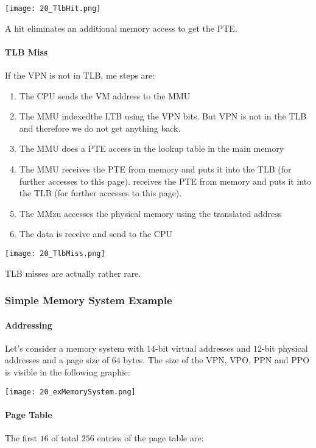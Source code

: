 \texttt{[image: 20\_TlbHit.png]}

A hit eliminates an additional memory access to get the PTE.

\paragraph{TLB Miss}
If the VPN is not in TLB, me steps are:

\begin{enumerate}
    \item The CPU sends the VM address to the MMU
    \item The MMU indexedthe LTB using the VPN bits. But VPN is not in the TLB and therefore we do not get anything back.
    \item The MMU does a PTE access in the lookup table in the main memory
    \item The MMU receives the PTE from memory and puts it into the TLB (for further accesses to this page). receives the PTE from memory and puts it into the TLB (for further accesses to this page).
    \item The MMzu accesses the physical memory using the translated address
    \item The data is receive and send to the CPU
\end{enumerate}

\texttt{[image: 20\_TlbMiss.png]}

TLB misses are actually rather rare.

\subsubsection{Simple Memory System Example}

\paragraph{Addressing}
Let's consider a memory system with $14$-bit virtual addresses and $12$-bit physical addresses and a page size of $64$ bytes. The size of the VPN, VPO, PPN and PPO is visible in the following graphic:

\texttt{[image: 20\_exMemorySystem.png]}

\paragraph{Page Table}
The first $16$ of total $256$ entries of the page table are:

